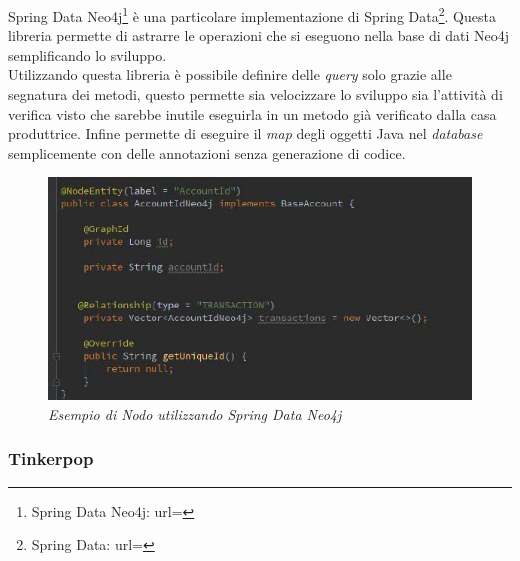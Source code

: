 Spring Data Neo4j\footnote{Spring Data Neo4j: url= } è una particolare implementazione di Spring Data\footnote{Spring Data: url= }. Questa libreria permette di astrarre le operazioni che si eseguono nella base di dati Neo4j semplificando lo sviluppo.\\
Utilizzando questa libreria è possibile definire delle \textit{query} solo grazie alle segnatura dei metodi, questo permette sia velocizzare lo sviluppo sia l'attività di verifica visto che sarebbe inutile eseguirla in un metodo già verificato dalla casa produttrice. Infine permette di eseguire il \textit{map} degli oggetti Java nel \textit{database} semplicemente con delle annotazioni senza generazione di codice.
\begin{figure}[h!]
	\centering
	\includegraphics[scale=0.33]{immagini/sdata.jpg}
	\caption{\textit{Esempio di Nodo utilizzando Spring Data Neo4j}}
\end{figure}

\subsubsection{Tinkerpop}

